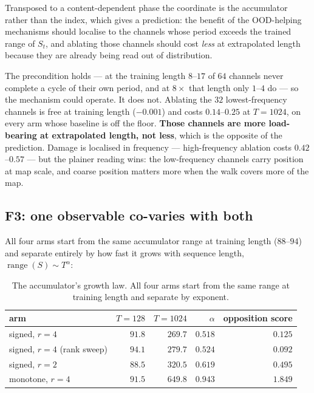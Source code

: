 \documentclass[11pt]{article}
\begin{document}
Transposed to a content-dependent
phase the coordinate is the accumulator rather than the index, which gives a
prediction: the benefit of the OOD-helping mechanisms should localise to the
channels whose period exceeds the trained range of $S_t$, and ablating those
channels should cost \emph{less} at extrapolated length because they are already
being read out of distribution.

The precondition holds --- at the training length $8$--$17$ of $64$ channels never
complete a cycle of their own period, and at $8\times$ that length only $1$--$4$ do
--- so the mechanism could operate. It does not. Ablating the $32$ lowest-frequency
channels is free at training length ($-0.001$) and costs $0.14$--$0.25$ at $T=1024$,
on every arm whose baseline is off the floor. \textbf{Those channels are more
load-bearing at extrapolated length, not less}, which is the opposite of the
prediction. Damage is localised in frequency --- high-frequency ablation costs
$0.42$--$0.57$ --- but the plainer reading wins: the low-frequency channels carry
position at map scale, and coarse position matters more when the walk covers more of
the map.

\subsection{F3: one observable co-varies with both}
\label{sec:growth} All
four arms start from the same accumulator range at training length ($88$--$94$) and
separate entirely by how fast it grows with sequence length,
$\operatorname{range}(S) \sim T^{\alpha}$:

\begin{table}[htbp]\centering\small
\caption{The accumulator's growth law. All four arms start from the same range at training length and separate by exponent.}
\label{tab:growth}
\begin{tabular}{lrrrr}
\toprule
arm & $T{=}128$ & $T{=}1024$ & $\alpha$ & opposition score \\
\midrule
signed, $r{=}4$   & $91.8$ & $269.7$ & $\mathbf{0.518}$ & $0.125$ \\
signed, $r{=}4$ (rank sweep) & $94.1$ & $279.7$ & $\mathbf{0.524}$ & $0.092$ \\
signed, $r{=}2$   & $88.5$ & $320.5$ & $0.619$ & $0.495$ \\
monotone, $r{=}4$ & $91.5$ & $649.8$ & $\mathbf{0.943}$ & $1.849$ \\
\bottomrule
\end{tabular}
\end{table}
\end{document}
